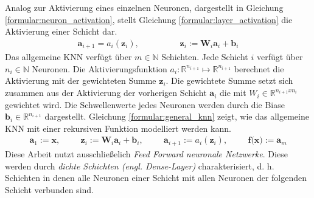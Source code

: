 Analog zur Aktivierung eines einzelnen Neuronen, dargestellt in Gleichung \ref{formular:neuron_activation}, stellt Gleichung \ref{formular:layer_activation} die Aktivierung einer Schicht dar.
\begin{align}
    \label{formular:layer_activation}
    \textbf{a}_{i+1} = a_i(\textbf{z}_i), \hspace{2cm} \textbf{z}_i := \textbf{W}_i\textbf{a}_i + \textbf{b}_i
\end{align}
Das allgemeine KNN verfügt über $m\in\mathbb{N}$ Schichten. Jede Schicht $i$ verfügt über $n_i\in\mathbb{N}$ Neuronen.
Die Aktivierungsfunktion $a_i:\mathbb{R}^{n_{i+1}}\mapsto\mathbb{R}^{n_{i+1}}$ berechnet die Aktivierung mit der gewichteten Summe $\textbf{z}_i$.
Die gewichtete Summe setzt sich zusammen aus der Aktivierung der vorherigen Schicht $\textbf{a}_i$ die mit $W_i\in\mathbb{R}^{n_{i+1}x{n_{i}}}$ gewichtet wird.
Die Schwellenwerte jedes Neuronen werden durch die Biase $\textbf{b}_i\in\mathbb{R}^{n_{i+1}}$ dargestellt.
Gleichung \ref{formular:general_knn} zeigt, wie das allgemeine KNN mit einer rekursiven Funktion modelliert werden kann.
\begin{align}
    \label{formular:general_knn}
    \textbf{a}_1 := \textbf{x}, \hspace{1cm}
    \textbf{z}_i := \textbf{W}_i\textbf{a}_i + \textbf{b}_i, \hspace{1cm}
    \textbf{a}_{i+1} := a_i(\textbf{z}_i), \hspace{1cm} \textbf{f(x)} := \textbf{a}_m
\end{align}
Diese Arbeit nutzt ausschließelich \textit{Feed Forward neuronale Netzwerke}.
Diese werden durch \textit{dichte Schichten (engl. Dense-Layer)} charakterisiert, d. h. Schichten in denen alle Neuronen einer Schicht mit allen Neuronen der folgenden Schicht verbunden sind.





